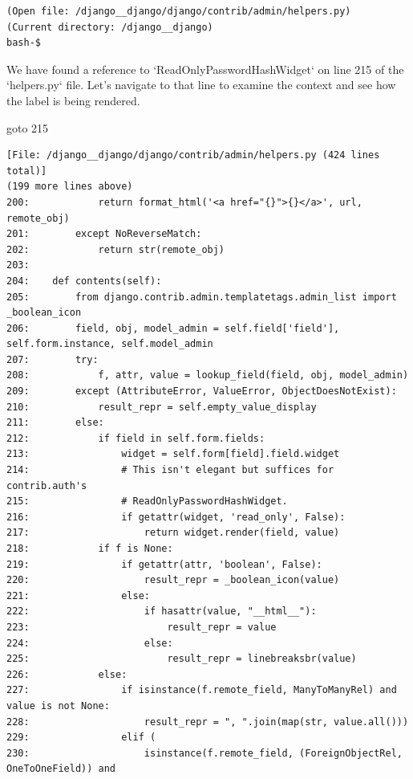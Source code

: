 {\begin{observationbox}
\begin{Verbatim}[breaklines=true, breakanywhere=true]
(Open file: /django__django/django/contrib/admin/helpers.py)
(Current directory: /django__django)
bash-$
\end{Verbatim}
\end{observationbox}
\begin{agentbox}
We have found a reference to `ReadOnlyPasswordHashWidget` on line 215 of the `helpers.py` file. Let's navigate to that line to examine the context and see how the label is being rendered.



\hrulefill
\begin{CodeVerbatim}[breaklines=true, breakanywhere=true]
goto 215
\end{CodeVerbatim}
\end{agentbox}
\begin{observationbox}\begin{Verbatim}[breaklines=true, breakanywhere=true]
[File: /django__django/django/contrib/admin/helpers.py (424 lines total)]
(199 more lines above)
200:            return format_html('<a href="{}">{}</a>', url, remote_obj)
201:        except NoReverseMatch:
202:            return str(remote_obj)
203:
204:    def contents(self):
205:        from django.contrib.admin.templatetags.admin_list import _boolean_icon
206:        field, obj, model_admin = self.field['field'], self.form.instance, self.model_admin
207:        try:
208:            f, attr, value = lookup_field(field, obj, model_admin)
209:        except (AttributeError, ValueError, ObjectDoesNotExist):
210:            result_repr = self.empty_value_display
211:        else:
212:            if field in self.form.fields:
213:                widget = self.form[field].field.widget
214:                # This isn't elegant but suffices for contrib.auth's
215:                # ReadOnlyPasswordHashWidget.
216:                if getattr(widget, 'read_only', False):
217:                    return widget.render(field, value)
218:            if f is None:
219:                if getattr(attr, 'boolean', False):
220:                    result_repr = _boolean_icon(value)
221:                else:
222:                    if hasattr(value, "__html__"):
223:                        result_repr = value
224:                    else:
225:                        result_repr = linebreaksbr(value)
226:            else:
227:                if isinstance(f.remote_field, ManyToManyRel) and value is not None:
228:                    result_repr = ", ".join(map(str, value.all()))
229:                elif (
230:                    isinstance(f.remote_field, (ForeignObjectRel, OneToOneField)) and

\end{Verbatim}
\end{observationbox}}
